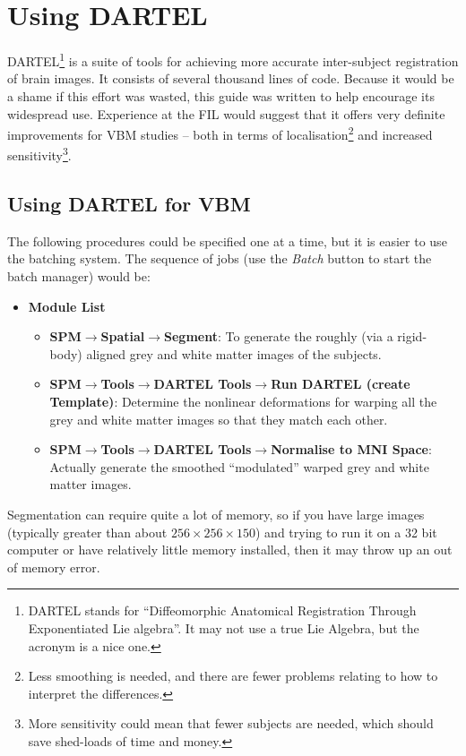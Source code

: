 \chapter{Using DARTEL \label{Chap:dartelguide}}

DARTEL\footnote{DARTEL stands for ``Diffeomorphic Anatomical Registration Through Exponentiated Lie algebra''.
It may not use a true Lie Algebra, but the acronym is a nice one.} is a suite of tools for achieving more accurate inter-subject registration of brain images.
It consists of several thousand lines of code. Because it would be a shame if this effort was wasted, this guide was written to help encourage its widespread use.
Experience at the FIL would suggest that it offers very definite improvements for VBM studies -- both in terms of localisation\footnote{Less smoothing is needed, and there are fewer problems relating to how to interpret the differences.} and increased sensitivity\footnote{More sensitivity could mean that fewer subjects are needed, which should save shed-loads of time and money.}.



\section{Using DARTEL for VBM \label{Sec:dartel_vbm}}
The following procedures could be specified one at a time, but it is easier to use the batching system.
The sequence of jobs (use the \emph{Batch} button to start the batch manager) would be:
\begin{itemize}
\item{{\bf Module List}
  \begin{itemize}
  \item{{\bf SPM$\rightarrow$Spatial$\rightarrow$Segment}: To generate the roughly (via a rigid-body) aligned grey and white matter images of the subjects.}
  \item{{\bf SPM$\rightarrow$Tools$\rightarrow$DARTEL Tools$\rightarrow$Run DARTEL (create Template)}: Determine the nonlinear deformations for warping all the grey and white matter images so that they match each other.}
  \item{{\bf SPM$\rightarrow$Tools$\rightarrow$DARTEL Tools$\rightarrow$Normalise to MNI Space}: Actually generate the smoothed ``modulated'' warped grey and white matter images.}
  \end{itemize}
}
\end{itemize}
Segmentation can require quite a lot of memory, so if you have large images (typically greater than about $256\times256\times150$) and trying to run it on a 32 bit computer or have relatively little memory installed, then it may throw up an out of memory error.

